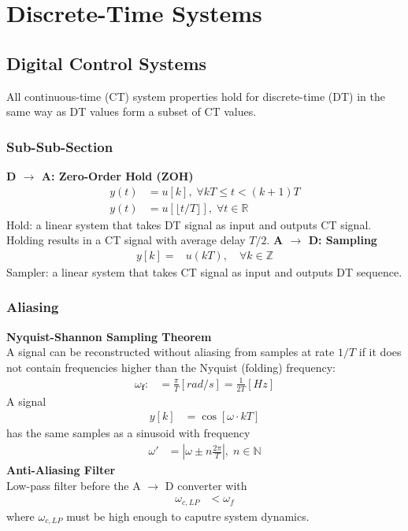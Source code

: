 \section{Discrete-Time Systems}
\subsection{Digital Control Systems}
All continuous-time (CT) system properties hold for discrete-time (DT) in the same way as DT values form a subset of CT values.
\subsubsection{Sub-Sub-Section}
\textbf{D $\rightarrow$ A: Zero-Order Hold (ZOH)}\\
\noindent\begin{align*}
    y(t) & =u[k], \; \forall kT \le t < (k+1)T                 \\
    y(t) & =u[\lfloor t/T\rfloor], \; \forall t \in \mathbb{R}
\end{align*}
Hold: a linear system that takes DT signal as input and outputs CT signal.\\
Holding results in a CT signal with average delay $T/2$.
\textbf{A $\rightarrow$ D: Sampling}\\
\noindent\begin{align*}
    y[k]= & u(kT),\quad\forall k\in\mathbb{Z}
\end{align*}
Sampler: a linear system that takes CT signal as input and outputs DT sequence.\\
\subsubsection{Aliasing}
\textbf{Nyquist-Shannon Sampling Theorem}\\
A signal can be reconstructed without aliasing from samples at rate $1/T$ if it does not contain frequencies higher than the Nyquist (folding) frequency:
\noindent\begin{align*}
    \omega_{\mathbf{f}}: & =\frac\pi T[rad/s]=\frac1{2T}[Hz]
\end{align*}
A signal
\noindent\begin{align*}
    y[k] & =\cos[\omega\cdot kT]
\end{align*}
has the same samples as a sinusoid with frequency
\noindent\begin{align*}
    \omega' & =\left|\omega\pm n\frac{2\pi}{T}\right|,\; n\in\mathbb{N}
\end{align*}
%
\textbf{Anti-Aliasing Filter}\\
Low-pass filter before the A $\rightarrow$ D converter with
\noindent\begin{align*}
    \omega_{c,LP} & < \omega_f
\end{align*}
where $\omega_{c,LP}$ must be high enough to caputre system dynamics.
%
%
